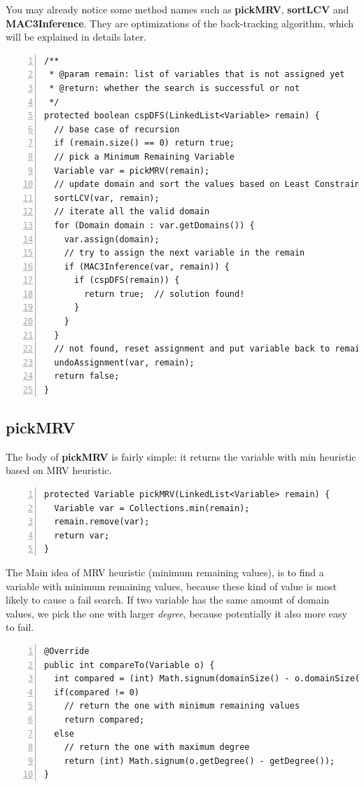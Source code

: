 \documentclass{article}
\begin{document}
You may already notice some method names such as \textbf{pickMRV}, \textbf{sortLCV} and \textbf{MAC3Inference}. They are optimizations of the back-tracking algorithm, which will be explained in details later.

\begin{lstlisting}[numbers=left]
/**
 * @param remain: list of variables that is not assigned yet
 * @return: whether the search is successful or not
 */
protected boolean cspDFS(LinkedList<Variable> remain) {
  // base case of recursion
  if (remain.size() == 0) return true;
  // pick a Minimum Remaining Variable
  Variable var = pickMRV(remain);
  // update domain and sort the values based on Least Constraining
  sortLCV(var, remain);
  // iterate all the valid domain
  for (Domain domain : var.getDomains()) {
    var.assign(domain);
    // try to assign the next variable in the remain
    if (MAC3Inference(var, remain)) {
      if (cspDFS(remain)) {
        return true;  // solution found!
      }
    }
  }
  // not found, reset assignment and put variable back to remain
  undoAssignment(var, remain);
  return false;
}
\end{lstlisting}





\clearpage
\subsection{pickMRV}

The body of \textbf{pickMRV} is fairly simple: it returns the variable with min heuristic based on MRV heuristic.

\begin{lstlisting}[numbers=left]   
protected Variable pickMRV(LinkedList<Variable> remain) {
  Variable var = Collections.min(remain);
  remain.remove(var);
  return var;
}
\end{lstlisting}

The Main idea of MRV heuristic (minimum remaining values), is to find a variable with minimum remaining values, because these kind of value is most likely to cause a fail search. If two variable has the same amount of domain values, we pick the one with larger \emph{degree}, because potentially it also more easy to fail.

\begin{lstlisting}[numbers=left]    
@Override
public int compareTo(Variable o) {
  int compared = (int) Math.signum(domainSize() - o.domainSize());
  if(compared != 0)
    // return the one with minimum remaining values
    return compared;
  else
    // return the one with maximum degree
    return (int) Math.signum(o.getDegree() - getDegree());
}
\end{lstlisting}
\end{document}

